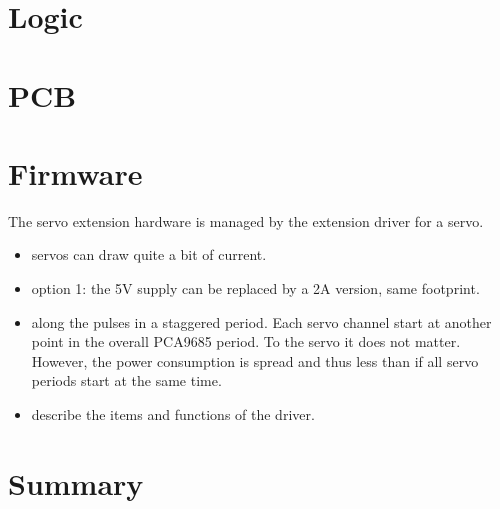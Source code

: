 
\section{Logic}


\section{PCB}


\section{Firmware}

The servo extension hardware is managed by the extension driver for a servo.

\begin{itemize}
\item servos can draw quite a bit of current.
\item option 1: the 5V supply can be replaced by a 2A version, same footprint.
\item along the pulses in a staggered period. Each servo channel start at another point in the overall PCA9685 period. To the servo it does not matter. However, the power consumption is spread and thus less than if all servo periods start at the same time.
\item describe the items and functions of the driver.
\end{itemize}

\section{Summary}

